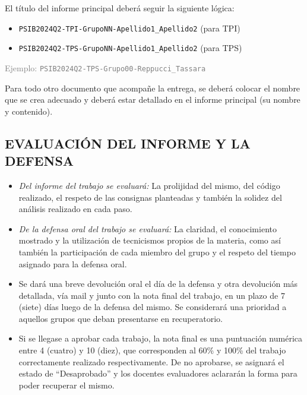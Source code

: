 \documentclass[10pt]{article}
\begin{document}
El título del informe principal deberá seguir la siguiente lógica:

\begin{itemize}
    \item \texttt{PSIB2024Q2-TPI-GrupoNN-Apellido1\_Apellido2} (para TPI)
    
    \item \texttt{PSIB2024Q2-TPS-GrupoNN-Apellido1\_Apellido2} (para TPS)
\end{itemize}

\textcolor{gray}{Ejemplo: \texttt{PSIB2024Q2-TPS-Grupo00-Reppucci\_Tassara}} \\ 

\vspace{0.25cm}

Para todo otro documento que acompañe la entrega, se deberá colocar el nombre que se crea adecuado y deberá estar detallado en el informe principal (su nombre y contenido). 

\vspace{0.25cm}
\subsection{EVALUACIÓN DEL INFORME Y LA DEFENSA}

\begin{itemize} 
    \item \textit{Del informe del trabajo se evaluará:} La prolijidad del mismo, del código realizado, el respeto de las consignas planteadas y también la solidez del análisis realizado en cada paso.
    
    \item \textit{De la defensa oral del trabajo se evaluará:} La claridad, el conocimiento mostrado y la utilización de tecnicismos propios de la materia, como así también la participación de cada miembro del grupo y el respeto del tiempo asignado para la defensa oral.

    \item Se dará una breve devolución oral el día de la defensa y otra devolución más detallada, vía mail y junto con la nota final del trabajo, en un plazo de 7 (siete) días luego de la defensa del mismo. Se considerará una prioridad a aquellos grupos que deban presentarse en recuperatorio.

    \item Si se llegase a aprobar cada trabajo, la nota final es una puntuación numérica entre 4 (cuatro) y 10 (diez), que corresponden al 60\% y 100\% del trabajo correctamente realizado respectivamente. De no aprobarse, se asignará el estado de ``Desaprobado” y los docentes evaluadores aclararán la forma para poder recuperar el mismo.
\end{itemize}
\end{document}
